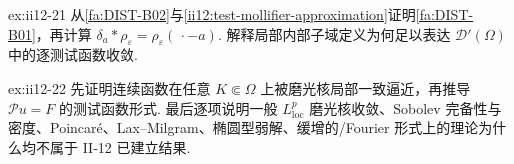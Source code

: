 \begin{FAExercise}{ex:ii12-21}
从\autoref{fa:DIST-B02}与\autoref{ii12:test-mollifier-approximation}证明\autoref{fa:DIST-B01}，再计算 \(\displaystyle\delta_a*\rho_\varepsilon=\rho_\varepsilon(\,\cdot-a)\). 解释局部内部子域定义为何足以表达 \(\displaystyle\mathcal D'(\Omega)\) 中的逐测试函数收敛.
\end{FAExercise}

\begin{FAExercise}{ex:ii12-22}
先证明连续函数在任意 \(\displaystyle K\Subset\Omega\) 上被磨光核局部一致逼近，再推导 \(\displaystyle\mathcal Pu=F\) 的测试函数形式. 最后逐项说明一般 \(\displaystyle L^p_{\mathrm{loc}}\) 磨光核收敛、Sobolev 完备性与密度、Poincaré、Lax--Milgram、椭圆型弱解、缓增的/Fourier 形式上的理论为什么均不属于 II-12 已建立结果.
\end{FAExercise}
